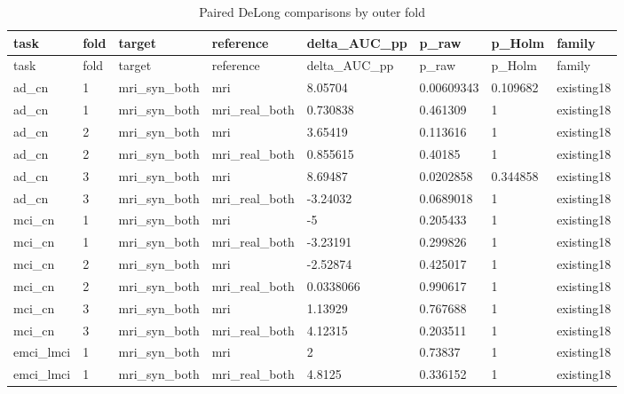 \documentclass{article}
\begin{document}


\begin{landscape}
\begingroup
\footnotesize
\setlength{\tabcolsep}{4pt}
\begin{longtable}{llllllll}
\caption{Paired DeLong comparisons by outer fold}\label{tab:classification_delong}\\
\toprule
task & fold & target & reference & delta\_AUC\_pp & p\_raw & p\_Holm & family \\
\midrule
\endfirsthead
\toprule
task & fold & target & reference & delta\_AUC\_pp & p\_raw & p\_Holm & family \\
\midrule
\endhead
\bottomrule
\endfoot
ad\_cn & 1 & mri\_syn\_both & mri & 8.05704 & 0.00609343 & 0.109682 & existing18 \\
ad\_cn & 1 & mri\_syn\_both & mri\_real\_both & 0.730838 & 0.461309 & 1 & existing18 \\
ad\_cn & 2 & mri\_syn\_both & mri & 3.65419 & 0.113616 & 1 & existing18 \\
ad\_cn & 2 & mri\_syn\_both & mri\_real\_both & 0.855615 & 0.40185 & 1 & existing18 \\
ad\_cn & 3 & mri\_syn\_both & mri & 8.69487 & 0.0202858 & 0.344858 & existing18 \\
ad\_cn & 3 & mri\_syn\_both & mri\_real\_both & -3.24032 & 0.0689018 & 1 & existing18 \\
mci\_cn & 1 & mri\_syn\_both & mri & -5 & 0.205433 & 1 & existing18 \\
mci\_cn & 1 & mri\_syn\_both & mri\_real\_both & -3.23191 & 0.299826 & 1 & existing18 \\
mci\_cn & 2 & mri\_syn\_both & mri & -2.52874 & 0.425017 & 1 & existing18 \\
mci\_cn & 2 & mri\_syn\_both & mri\_real\_both & 0.0338066 & 0.990617 & 1 & existing18 \\
mci\_cn & 3 & mri\_syn\_both & mri & 1.13929 & 0.767688 & 1 & existing18 \\
mci\_cn & 3 & mri\_syn\_both & mri\_real\_both & 4.12315 & 0.203511 & 1 & existing18 \\
emci\_lmci & 1 & mri\_syn\_both & mri & 2 & 0.73837 & 1 & existing18 \\
emci\_lmci & 1 & mri\_syn\_both & mri\_real\_both & 4.8125 & 0.336152 & 1 & existing18 \\

\end{longtable}
\end{landscape}
\end{document}
